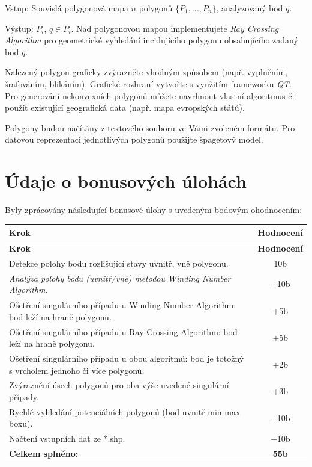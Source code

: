 \documentclass[a4paper,12pt]{article}
\begin{document}
Vstup: Souvislá polygonová mapa $n$ polygonů $\{P_1, ..., P_n\}$, analyzovaný bod $q$.

Výstup: $P_i$,  $q \in P_i$. 
Nad polygonovou mapou implementujete \textit{Ray Crossing Algorithm} pro geometrické vyhledání incidujícího polygonu obsahujícího zadaný bod $q$.

Nalezený polygon graficky zvýrazněte vhodným způsobem (např. vyplněním, šrafováním, blikáním). Grafické rozhraní vytvořte s využitím frameworku \textit{QT}. Pro generování nekonvexních polygonů můžete navrhnout vlastní algoritmus či použít existující geografická data (např. mapa evropských států).

Polygony budou načítány z textového souboru ve Vámi zvoleném formátu. Pro datovou reprezentaci jednotlivých polygonů použijte špagetový model.

\section{Údaje o bonusových úlohách}

Byly zprácovány následující bonusové úlohy s uvedeným bodovým ohodnocením:

\begin{small}
\begin{longtable}{|p{12cm}|c|}
    \hline
    \textbf{Krok} & \textbf{Hodnocení} \\
    \hline
    \endfirsthead
    
    \hline
    \textbf{Krok} & \textbf{Hodnocení} \\
    \hline
    \endhead

    Detekce polohy bodu rozlišující stavy uvnitř, vně polygonu. & 10b \\
    \hline
    \textit{Analýza polohy bodu (uvnitř/vně) metodou Winding Number Algorithm.} & +10b \\
    \hline
    Ošetření singulárního případu u Winding Number Algorithm: bod leží na hraně polygonu. & +5b \\
    \hline
    Ošetření singulárního případu u Ray Crossing Algorithm: bod leží na hraně polygonu. & +5b \\
    \hline
    Ošetření singulárního případu u obou algoritmů: bod je totožný s vrcholem jednoho či více polygonů. & +2b \\
    \hline
    Zvýraznění úsech polygonů pro oba výše uvedené singulární případy. & +3b \\
    \hline
    Rychlé vyhledání potenciálních polygonů (bod uvnitř min-max boxu). & +10b \\
    \hline
    Načtení vstupních dat ze *.shp. & +10b \\
    \hline
    \textbf{Celkem splněno:} & \textbf{55b} \\
    \hline
\end{longtable}
\end{small}
\end{document}
